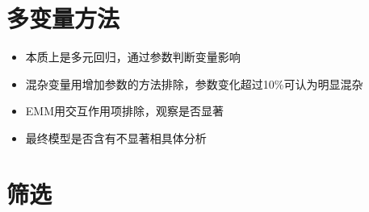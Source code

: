 \documentclass[]{book}
\providecommand{\tightlist}{%
  \setlength{\itemsep}{0pt}\setlength{\parskip}{0pt}}
\begin{document}
\section{多变量方法}

\begin{itemize}
\tightlist
\item
  本质上是多元回归，通过参数判断变量影响
\item
  混杂变量用增加参数的方法排除，参数变化超过10\%可认为明显混杂
\item
  EMM用交互作用项排除，观察是否显著
\item
  最终模型是否含有不显著相具体分析
\end{itemize}

\section{筛选}
\end{document}
